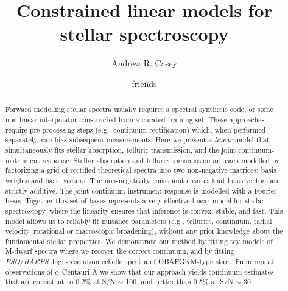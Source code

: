\documentclass[modern]{aastex631}
\newcommand{\chosentitle}{Constrained linear models for stellar spectroscopy}
\newcommand{\project}[1]{\textit{#1}}
\newcommand{\eso}{\project{ESO}}
\newcommand{\harps}{\project{HARPS}}
\newcommand{\todo}[1]{\textcolor{tab:red}{#1}}
\begin{document}
\title{\chosentitle}

\author[0000-0003-0174-0564]{Andrew R. Casey}

\author{friends}



\begin{abstract}\noindent
Forward modelling stellar spectra usually requires a spectral synthesis code, or some non-linear interpolator constructed from a curated training set.
These approaches require pre-processing steps (e.g., continuum rectification) which, when performed separately, can bias subsequent measurements.
Here we present a \emph{linear} model that simultaneously fits stellar absorption, telluric transmission, and the joint continuum-instrument response.
Stellar absorption and telluric transmission are each modelled by factorizing a grid of rectified theoretical spectra into two non-negative matrices: basis weights and basis vectors.
The non-negativity constraint ensures that basis vectors are strictly additive.
The joint continuum-instrument response is modelled with a Fourier basis. 
Together this set of bases represents a very effective linear model for stellar spectroscopy, where the linearity ensures that inference is convex, stable, and fast.
This model allows us to reliably fit nuisance parameters (e.g., tellurics, continuum, radial velocity, rotational or macroscopic broadening), without any prior knowledge about the fundamental stellar properties.
We demonstrate our method by fitting \todo{toy models of M-dwarf spectra where we recover the correct continuum, and by fitting} \eso/\harps\ high-resolution echelle spectra of OBAFGKM-type stars.
From repeat observations of $\alpha$-Centauri A we show that our approach yields continuum estimates that are consistent to 0.2\% at S/N $\sim$ 100, and better than 0.5\% at S/N $\sim$ 30.
\end{abstract}
\end{document}
